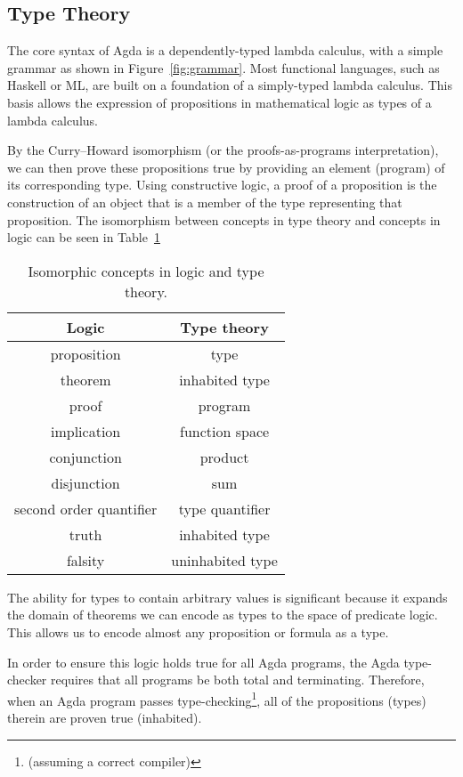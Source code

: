 

\subsection{Type Theory}
The core syntax of Agda is a dependently-typed lambda calculus, with a simple grammar as shown in Figure~\ref{fig:grammar}. Most functional languages, such as Haskell or ML, are built on a foundation of a simply-typed lambda calculus. This basis allows the expression of propositions in mathematical logic as types of a lambda calculus.

By the Curry–Howard isomorphism (or the proofs-as-programs interpretation), we can then prove these propositions true by providing an element (program) of its corresponding type.\cite{poernomo2005} Using constructive logic, a proof of a proposition is the construction of an object that is a member of the type representing that proposition. The isomorphism between concepts in type theory and concepts in logic can be seen in Table~\ref{table:curry_howard}

\begin{table}
\begin{center}
\begin{tabular}{c|c}
Logic & Type theory \\
\hline
proposition & type\\
theorem & inhabited type\\
proof & program\\
implication & function space\\
conjunction & product\\
disjunction & sum\\
second order quantifier & type quantifier\\
truth & inhabited type\\
falsity & uninhabited type\\
\end{tabular}
\end{center}
\caption{Isomorphic concepts in logic and type theory.}
\label{table:curry_howard}
\end{table}

The ability for types to contain arbitrary values is significant because it expands the domain of theorems we can encode as types to the space of predicate logic. This allows us to encode almost any proposition or formula as a type.

 In order to ensure this logic holds true for all Agda programs, the Agda type-checker requires that all programs be both total and terminating.\cite{norell2009} Therefore, when an Agda program passes type-checking\footnote{(assuming a correct compiler)}, all of the propositions (types) therein are proven true (inhabited).

